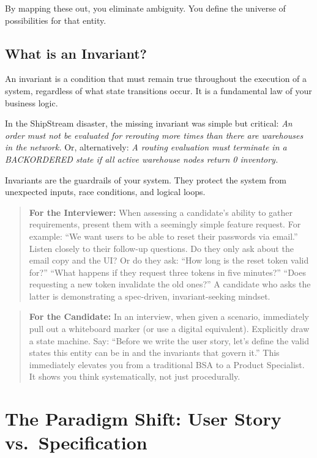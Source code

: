 By mapping these out, you eliminate ambiguity. You define the universe
of possibilities for that entity.

\subsection{What is an Invariant?}\label{what-is-an-invariant}

An invariant is a condition that must remain true throughout the
execution of a system, regardless of what state transitions occur. It is
a fundamental law of your business logic.

In the ShipStream disaster, the missing invariant was simple but
critical: \emph{An order must not be evaluated for rerouting more times
than there are warehouses in the network.} Or, alternatively: \emph{A
routing evaluation must terminate in a BACKORDERED state if all active
warehouse nodes return 0 inventory.}

Invariants are the guardrails of your system. They protect the system
from unexpected inputs, race conditions, and logical loops.

\begin{quote}
\textbf{For the Interviewer:} When assessing a candidate's ability to
gather requirements, present them with a seemingly simple feature
request. For example: ``We want users to be able to reset their
passwords via email.'' Listen closely to their follow-up questions. Do
they only ask about the email copy and the UI? Or do they ask: ``How
long is the reset token valid for?'' ``What happens if they request
three tokens in five minutes?'' ``Does requesting a new token invalidate
the old ones?'' A candidate who asks the latter is demonstrating a
spec-driven, invariant-seeking mindset.
\end{quote}

\begin{quote}
\textbf{For the Candidate:} In an interview, when given a scenario,
immediately pull out a whiteboard marker (or use a digital equivalent).
Explicitly draw a state machine. Say: ``Before we write the user story,
let's define the valid states this entity can be in and the invariants
that govern it.'' This immediately elevates you from a traditional BSA
to a Product Specialist. It shows you think systematically, not just
procedurally.
\end{quote}

\section{The Paradigm Shift: User Story
vs.~Specification}\label{the-paradigm-shift-user-story-vs.-specification}

